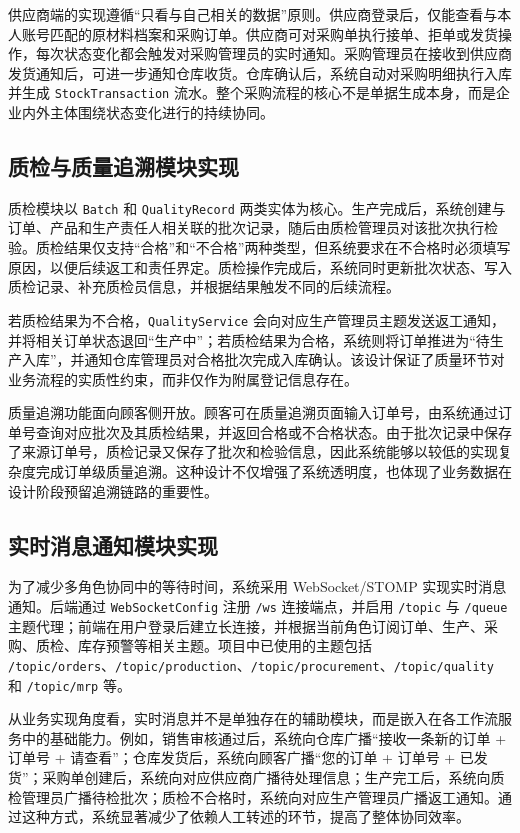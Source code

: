 供应商端的实现遵循“只看与自己相关的数据”原则。供应商登录后，仅能查看与本人账号匹配的原材料档案和采购订单。供应商可对采购单执行接单、拒单或发货操作，每次状态变化都会触发对采购管理员的实时通知。采购管理员在接收到供应商发货通知后，可进一步通知仓库收货。仓库确认后，系统自动对采购明细执行入库并生成 \texttt{StockTransaction} 流水。整个采购流程的核心不是单据生成本身，而是企业内外主体围绕状态变化进行的持续协同。

\subsection{质检与质量追溯模块实现}

质检模块以 \texttt{Batch} 和 \texttt{QualityRecord} 两类实体为核心。生产完成后，系统创建与订单、产品和生产责任人相关联的批次记录，随后由质检管理员对该批次执行检验。质检结果仅支持“合格”和“不合格”两种类型，但系统要求在不合格时必须填写原因，以便后续返工和责任界定。质检操作完成后，系统同时更新批次状态、写入质检记录、补充质检员信息，并根据结果触发不同的后续流程。

若质检结果为不合格，\texttt{QualityService} 会向对应生产管理员主题发送返工通知，并将相关订单状态退回“生产中”；若质检结果为合格，系统则将订单推进为“待生产入库”，并通知仓库管理员对合格批次完成入库确认。该设计保证了质量环节对业务流程的实质性约束，而非仅作为附属登记信息存在。

质量追溯功能面向顾客侧开放。顾客可在质量追溯页面输入订单号，由系统通过订单号查询对应批次及其质检结果，并返回合格或不合格状态。由于批次记录中保存了来源订单号，质检记录又保存了批次和检验信息，因此系统能够以较低的实现复杂度完成订单级质量追溯。这种设计不仅增强了系统透明度，也体现了业务数据在设计阶段预留追溯链路的重要性。

\subsection{实时消息通知模块实现}

为了减少多角色协同中的等待时间，系统采用 WebSocket/STOMP 实现实时消息通知。后端通过 \texttt{WebSocketConfig} 注册 \texttt{/ws} 连接端点，并启用 \texttt{/topic} 与 \texttt{/queue} 主题代理；前端在用户登录后建立长连接，并根据当前角色订阅订单、生产、采购、质检、库存预警等相关主题。项目中已使用的主题包括 \texttt{/topic/orders}、\texttt{/topic/production}、\texttt{/topic/procurement}、\texttt{/topic/quality} 和 \texttt{/topic/mrp} 等。

从业务实现角度看，实时消息并不是单独存在的辅助模块，而是嵌入在各工作流服务中的基础能力。例如，销售审核通过后，系统向仓库广播“接收一条新的订单 + 订单号 + 请查看”；仓库发货后，系统向顾客广播“您的订单 + 订单号 + 已发货”；采购单创建后，系统向对应供应商广播待处理信息；生产完工后，系统向质检管理员广播待检批次；质检不合格时，系统向对应生产管理员广播返工通知。通过这种方式，系统显著减少了依赖人工转述的环节，提高了整体协同效率。

